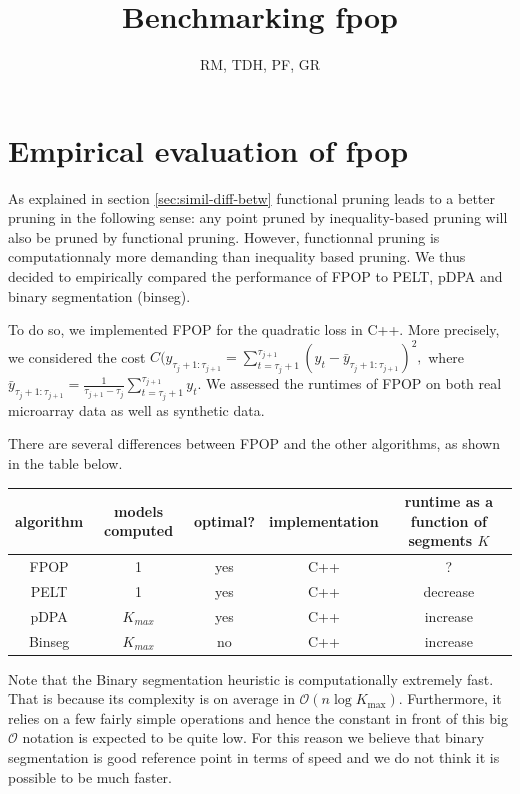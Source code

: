\documentclass{article}
\begin{document}
\title{Benchmarking fpop}
\author{RM, TDH, PF, GR}
\maketitle

\tableofcontents

\section{Empirical evaluation of fpop}

As explained in section \ref{sec:simil-diff-betw} functional pruning
leads to a better pruning in the following sense: any point pruned by
inequality-based pruning will also be pruned by functional pruning.
However, functionnal pruning is computationnaly more demanding than
inequality based pruning.  We thus decided to empirically compared the
performance of FPOP to PELT, pDPA and binary segmentation (binseg).

To do so, we implemented FPOP for the quadratic loss in C++.
More precisely, we considered the cost $C(y_{\tau_j+1:\tau_{j+1}} = \sum_{t=\tau_j+1}^{\tau_{j+1}} (y_t - \bar{y}_{\tau_j+1:\tau_{j+1}})^2,$ where
$ \bar{y}_{\tau_j+1:\tau_{j+1}} = \frac{1}{\tau_{j+1} - \tau_j} \sum_{t=\tau_j+1}^{\tau_{j+1}} y_t$.
We assessed the runtimes of FPOP on both real microarray data as well as synthetic data.

There are several differences between FPOP and the other
algorithms, as shown in the table below.
\begin{center}
  \begin{tabular}{ccccc}
    algorithm & models computed & optimal? & implementation & runtime as a function of segments $K$\\
    \hline
    FPOP & 1 & yes & C++  &  ?                  \\
    PELT & 1 & yes & C++  &  decrease \\
    pDPA & $K_{max}$ & yes & C++ & increase \\
    Binseg & $K_{max}$ & no & C++ & increase
  \end{tabular}
\end{center}

Note that the Binary segmentation heuristic is computationally
extremely fast. That is because its complexity is on average in
$\mathcal{O}(n \log K_{\text{max}})$. Furthermore, it relies on a few
fairly simple operations and hence the constant in front of this big
$\mathcal O$ notation is expected to be quite low.  For this reason we
believe that binary segmentation is good reference point in terms of
speed and we do not think it is possible to be much faster.
\end{document}
